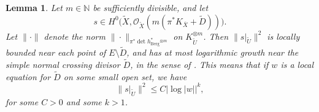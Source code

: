 \documentclass[JEP,XML,SOM,Unicode]{cedram}
\let\mathcal\mathscr
\theoremstyle{plain}
\newtheorem{lemma}[theorem]{Lemma}
\theoremstyle{definition}
\numberwithin{equation}{theorem}
\newcommand{\norm}[1] { \| #1 \| }
\begin{document}
\begin{lemma} \label{lemgrowth} Let $m \in \mathbb N$ be sufficiently divisible, and let\vspace*{-1pt}\enlargethispage{.5\baselineskip}%
$$s \in H^0 \bigl( \widetilde{X}, \mathcal O_{\widetilde{X}}(m (\pi^\ast K_{\overline{X}} + \widetilde{D})) \bigr).$$
Let $\norm{ \cdot }$ denote the norm $\norm{\cdot}_{\pi^\ast \det h_{\mathrm{Berg}}^\ast {}^{\otimes m}}$ on $K_{\widetilde{U}}^{\otimes m}$. Then $\norm{s|_{\widetilde{U}}}^2$ is locally bounded near each point of $E \setminus \widetilde{D}$, and has at most logarithmic growth near the simple normal crossing divisor $\widetilde{D}$, in the sense of \cite{Mum77}. This means that if $w$ is a local equation for $\widetilde{D}$ on some small open set, we have\vspace*{-3pt}
$$
\norm{s|_{\widetilde{U}}}^2 \leq C \left| \log |w| \right|^k,
$$
for some $C > 0$ and some $k > 1$.
\end{lemma}
\end{document}
